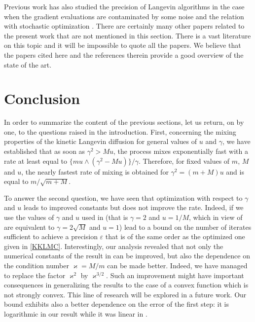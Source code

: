 \documentclass[a4paper,bej,preprint,reqno]{imsart}
\begin{document}
Previous work has also studied the precision of Langevin algorithms in the case when the
gradient evaluations are contaminated by some noise \citep{DalalyanColt,DalKar17,Cheng2,Baker2018,pmlr-v80-chatterji18a}
and the relation with stochastic optimization \citep{raginsky17a,zhang17b,2017arXiv170706618X,2017arXiv170706386D}.
There are certainly many other papers related to the present work that are not mentioned in this
section. There is a vast literature on this topic and it will be impossible to quote all
the papers. We believe that the papers cited here and the references therein provide a good
overview of the state of the art.

\section{Conclusion} \label{sec:concl}

In order to summarize the content of the previous sections, let us return, on by one, to the questions raised in the
introduction. First, concerning the mixing properties of the kinetic Langevin diffusion for general values of $u$ and $\gamma$,
we have established that as soon as $\gamma^2 > Mu$, the process mixes exponentially fast with  a rate at least equal to
$\{mu \wedge (\gamma^2-Mu)\}/\gamma$. Therefore, for fixed values of $m$, $M$ and $u$, the nearly fastest rate of mixing
is obtained for $\gamma^2 = (m+M)u$ and is equal to $m/\sqrt{m+M}$.

To answer the second question, we have seen that optimization with respect to $\gamma$ and $u$ leads to improved constants
but does not improve the rate. Indeed, if we use the values of $\gamma$ and $u$ used in \citep{Cheng2} (that is $\gamma= 2$
and $u= 1/M$, which in view of  are equivalent to $\gamma = 2\sqrt{M}$ and $u=1$) lead to a bound on the
number of iterates sufficient to achieve a precision $\varepsilon$ that is of the same order as the optimized one given in
\eqref{KKLMC}. Interestingly, our analysis revealed that not only the numerical constants of the result in \citep{Cheng2}
can be improved, but also the dependence on the condition number $\varkappa = M/m$ can be made better. Indeed, we have
managed to replace the factor $\varkappa^2$ by $\varkappa^{3/2}$. Such an improvement might have important consequences
in generalizing the results to the case of a convex function which is not strongly convex. This line of research will be
explored in a future work. Our bound exhibits also a better dependence on the error of the first step: it is
logarithmic in our result while it was linear in \citep{Cheng2}.
\end{document}
